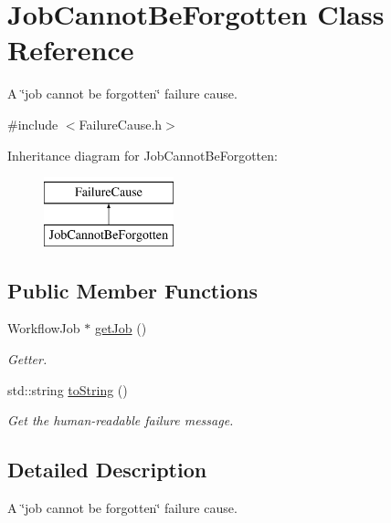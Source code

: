 \hypertarget{class_job_cannot_be_forgotten}{}\section{Job\+Cannot\+Be\+Forgotten Class Reference}
\label{class_job_cannot_be_forgotten}


A \char`\"{}job cannot be forgotten\char`\"{} failure cause.  




{\ttfamily \#include $<$Failure\+Cause.\+h$>$}

Inheritance diagram for Job\+Cannot\+Be\+Forgotten\+:\begin{figure}[H]
\begin{center}
\leavevmode
\includegraphics[height=2.000000cm]{class_job_cannot_be_forgotten}
\end{center}
\end{figure}
\subsection*{Public Member Functions}
\begin{DoxyCompactItemize}
\item 
Workflow\+Job $\ast$ \hyperlink{class_job_cannot_be_forgotten_a998be9b69eb911d071773ab8cb9d5ac0}{get\+Job} ()
\begin{DoxyCompactList}\small\item\em Getter. \end{DoxyCompactList}\item 
std\+::string \hyperlink{class_job_cannot_be_forgotten_afec3f02dea4282b31f914cf2b9ab2b54}{to\+String} ()
\begin{DoxyCompactList}\small\item\em Get the human-\/readable failure message. \end{DoxyCompactList}\end{DoxyCompactItemize}


\subsection{Detailed Description}
A \char`\"{}job cannot be forgotten\char`\"{} failure cause. 

